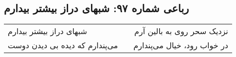 \begin{center}
\section*{رباعی شماره ۹۷: شبهای دراز بیشتر بیدارم}
\label{sec:097}
\begin{longtable}{l p{0.5cm} r}
شبهای دراز بیشتر بیدارم
&&
نزدیک سحر روی به بالین آرم
\\
می‌پندارم که دیده بی دیدن دوست
&&
در خواب رود، خیال می‌پندارم
\\
\end{longtable}
\end{center}
